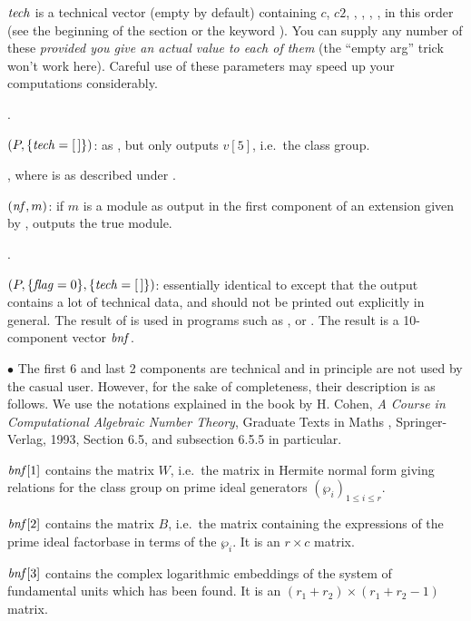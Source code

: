 $\hbox{\it tech\/}$ is a technical vector (empty by default) containing $c$, $c2$,
, , , , in this order (see
the beginning of the section or the keyword ).
You can supply any number of these \emph{provided you give an actual value to
each of them} (the ``empty arg'' trick won't work here). Careful use of these
parameters may speed up your computations considerably.

.

$(P,\{\hbox{\it tech\/}=[\,]\})$: as , but only
outputs $v[5]$, i.e.~the class group.

, where 
is as described under .

$(\hbox{\it nf\/},m)$: if $m$ is a module as output in the
first component of an extension given by , outputs the
true module.

.

$(P,\{\hbox{\it f\kern0pt lag\/}=0\},\{\hbox{\it tech\/}=[\,]\})$: essentially identical
to  except that the output contains a lot of technical data,
and should not be printed out explicitly in general. The result of
 is used in programs such as ,
 or . The result is a 10-component vector
$\hbox{\it bnf\/}$.

\noindent $\bullet$ The first 6 and last 2 components are technical and in
principle are not used by the casual user. However, for the sake of
completeness, their description is as follows. We use the notations explained
in the book by H. Cohen, \emph{A Course in Computational Algebraic Number
Theory}, Graduate Texts in Maths , Springer-Verlag, 1993, Section
6.5, and subsection 6.5.5 in particular.

$\hbox{\it bnf\/}[1]$ contains the matrix $W$, i.e.~the matrix in Hermite normal
form giving relations for the class group on prime ideal generators
$(\wp_i)_{1\le i\le r}$.

$\hbox{\it bnf\/}[2]$ contains the matrix $B$, i.e.~the matrix containing the
expressions of the prime ideal factorbase in terms of the $\wp_i$. It is an
$r\times c$ matrix.

$\hbox{\it bnf\/}[3]$ contains the complex logarithmic embeddings of the system of
fundamental units which has been found. It is an $(r_1+r_2)\times(r_1+r_2-1)$
matrix.


